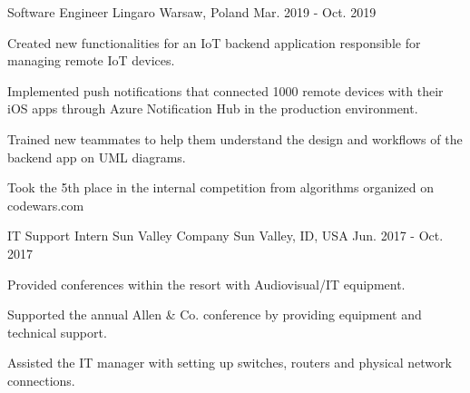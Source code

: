\begin{cventries}
  \cventry
    {Software Engineer} %
    {Lingaro} %
    {Warsaw, Poland} %
    {Mar. 2019 - Oct. 2019} %
    {
      \begin{cvitems} %
        \item {Created new functionalities for an IoT backend application responsible for managing remote IoT devices.}
        \item {Implemented push notifications that connected 1000 remote devices with their iOS apps through Azure Notification Hub in the production environment.}
        \item {Trained new teammates to help them understand the design and workflows of the backend app on UML diagrams.}
        \item {Took the 5th place in the internal competition from algorithms organized on codewars.com}
      \end{cvitems}
    }

  \cventry
    {IT Support Intern} %
    {Sun Valley Company} %
    {Sun Valley, ID, USA} %
    {Jun. 2017 - Oct. 2017} %
    {
      \begin{cvitems} %
        \item {Provided conferences within the resort with Audiovisual/IT equipment.}
        \item {Supported the annual Allen \& Co. conference by providing equipment and technical support.}
        \item {Assisted the IT manager with setting up switches, routers and physical network connections.}
      \end{cvitems}
    }

\end{cventries}
